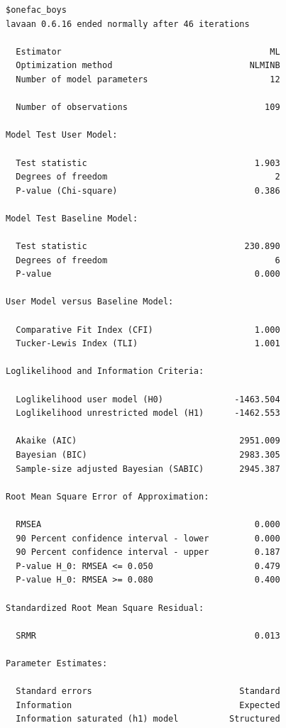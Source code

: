 \documentclass[
  letterpaper,
  DIV=11,
  numbers=noendperiod]{scrreprt}
\begin{document}
\begin{verbatim}
$onefac_boys
lavaan 0.6.16 ended normally after 46 iterations

  Estimator                                         ML
  Optimization method                           NLMINB
  Number of model parameters                        12

  Number of observations                           109

Model Test User Model:
                                                      
  Test statistic                                 1.903
  Degrees of freedom                                 2
  P-value (Chi-square)                           0.386

Model Test Baseline Model:

  Test statistic                               230.890
  Degrees of freedom                                 6
  P-value                                        0.000

User Model versus Baseline Model:

  Comparative Fit Index (CFI)                    1.000
  Tucker-Lewis Index (TLI)                       1.001

Loglikelihood and Information Criteria:

  Loglikelihood user model (H0)              -1463.504
  Loglikelihood unrestricted model (H1)      -1462.553
                                                      
  Akaike (AIC)                                2951.009
  Bayesian (BIC)                              2983.305
  Sample-size adjusted Bayesian (SABIC)       2945.387

Root Mean Square Error of Approximation:

  RMSEA                                          0.000
  90 Percent confidence interval - lower         0.000
  90 Percent confidence interval - upper         0.187
  P-value H_0: RMSEA <= 0.050                    0.479
  P-value H_0: RMSEA >= 0.080                    0.400

Standardized Root Mean Square Residual:

  SRMR                                           0.013

Parameter Estimates:

  Standard errors                             Standard
  Information                                 Expected
  Information saturated (h1) model          Structured


\end{verbatim}
\end{document}
